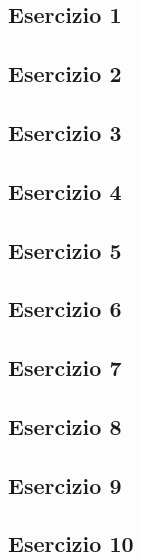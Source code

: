 \vspace{0.8cm}
\subsection{\textbf{Esercizio 1}}

\newpage
\subsection{\textbf{Esercizio 2}}

\newpage
\subsection{\textbf{Esercizio 3}}

\newpage
\subsection{\textbf{Esercizio 4}}

\newpage
\subsection{\textbf{Esercizio 5}}

\newpage
\subsection{\textbf{Esercizio 6}}

\newpage
\subsection{\textbf{Esercizio 7}}

\newpage
\subsection{\textbf{Esercizio 8}}

\newpage
\subsection{\textbf{Esercizio 9}}

\newpage
\subsection{\textbf{Esercizio 10}}

\newpage
